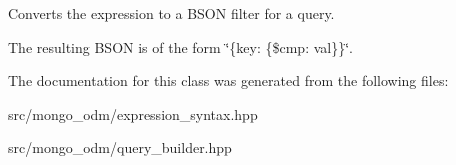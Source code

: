 Converts the expression to a B\+S\+ON filter for a query. 

The resulting B\+S\+ON is of the form \char`\"{}\{key\+: \{\$cmp\+: val\}\}\char`\"{}. 

The documentation for this class was generated from the following files\+:\begin{DoxyCompactItemize}
\item 
src/mongo\+\_\+odm/expression\+\_\+syntax.\+hpp\item 
src/mongo\+\_\+odm/query\+\_\+builder.\+hpp\end{DoxyCompactItemize}

